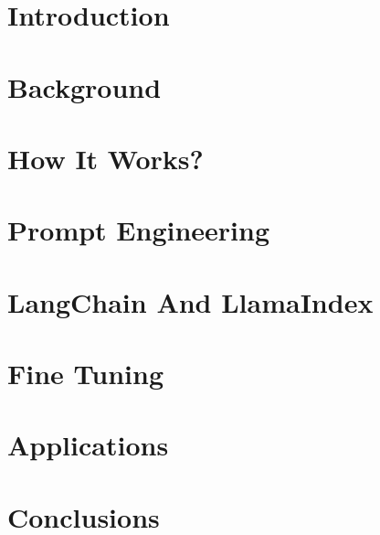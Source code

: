 \section[Intro]{Introduction}


\section[Back]{Background}


\section[How]{How It Works?}


\section[Prompts]{Prompt Engineering}


\section[LL]{LangChain And LlamaIndex}



\section[Consult]{Fine Tuning}




\section[Apps]{Applications}


\section[Concl]{Conclusions}

